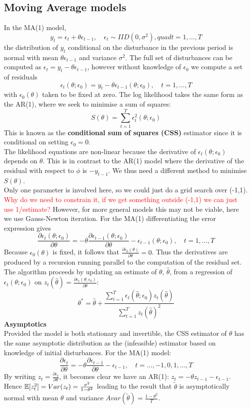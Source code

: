 \documentclass[DIV=14,titlepage=false]{scrreprt}
\begin{document}
\subsection{Moving Average models}
In the MA(1) model,
\[
    y_t = \epsilon_t + \theta \epsilon_{t-1}, \quad \epsilon_t \sim IID(0, \sigma^2), quad t = 1, \dots, T
\]
the distribution of $y_t$ conditional on the disturbance in the previous period is normal with mean $\theta \epsilon_{t-1}$ and variance $\sigma^2$. The full set of disturbances can be computed as $\epsilon_t = y_t - \theta \epsilon_{t-1}$, however without knowledge of $\epsilon_0$ we compute a set of residuals
\[
    \epsilon_t (\theta;\epsilon_0) = y_t - \theta \epsilon_{t-1}(\theta;\epsilon_0), \quad t = 1, \dots, T
\]
with $\epsilon_0(\theta)$ taken to be fixed at zero. The log likelihood takes the same form as the AR(1), where we seek to minimise a sum of squares:
\[
    S(\theta) = \sum_{t=1}^{T} \epsilon_t^2(\theta;\epsilon_0)
\]
This is known as the \textbf{conditional sum of squares (CSS)} estimator since it is conditional on setting $\epsilon_0 = 0$.\\
The likelihood equations are non-linear because the derivative of $\epsilon_t(\theta;\epsilon_0)$ depends on $\theta$. This is in contrast to the AR(1) model where the derivative of the residual with respect to $\phi$ is $-y_{t-1}$. We thus need a different method to minimise $S(\theta)$.\\
Only one parameter is involved here, so we could just do a grid search over (-1,1). \textcolor{red}{Why do we need to constrain it, if we get something outside (-1,1) we can just use 1/estimate?} However, for more general models this may not be viable, here we use Gauss-Newton iteration. For the MA(1) differentiating the error expression gives 
\[
    \frac{ \partial \epsilon_t(\theta;\epsilon_0)}{\partial \theta} = -\theta \frac{\partial \epsilon_{t-1}(\theta;\epsilon_0)}{\partial \theta} - \epsilon_{t-1}(\theta;\epsilon_0) , \quad t = 1, \dots, T
\]
Because $\epsilon_0(\theta)$ is fixed, it follows that $\frac{\partial \epsilon_0(\theta)}{\partial \theta} = 0$. Thus the derivatives are produced by a recursion running parallel to the computation of the residual set. The algorithm proceeds by updating an estimate of $\theta$, $\hat \theta$, from a regression of $\epsilon_t(\theta;\epsilon_0)$ on $z_t(\hat \theta)= \frac{\partial \epsilon_t(\theta;\epsilon_0)}{\partial \theta}$:
\[
    \theta^*=\hat \theta + \frac{\sum_{t=1}^{T} \epsilon_t(\hat \theta;\epsilon_0) z_t(\hat \theta)}{\sum_{t=1}^{T} z_t(\hat \theta)^2}
\]
\textbf{Asymptotics}\\
Provided the model is both stationary and invertible, the CSS estimator of $\theta$ has the same asymptotic distribution as the (infeasible) estimator based on knowledge of initial disturbances. For the MA(1) model:
\[
   \frac{\partial \epsilon_t}{\partial \theta} = -\theta \frac{\partial \epsilon_{t-1}}{\partial \theta} - \epsilon_{t-1} , \quad t = \dots, -1, 0, 1, \dots, T
\]
By writing $z_t = \frac{\partial \epsilon_t}{\partial \theta}$, it becomes clear we have an AR(1): $z_t = -\theta z_{t-1} - \epsilon_{t-1}$. Hence $\mathbb{E} [z_t^2] = Var(z_t) = \frac{\sigma^2}{1-\theta^2}$ leading to the result that $\tilde \theta$ is asymptotically normal with mean $\theta$ and variance $Avar(\tilde \theta) = \frac{1-\theta^2}{T}$.
\end{document}
